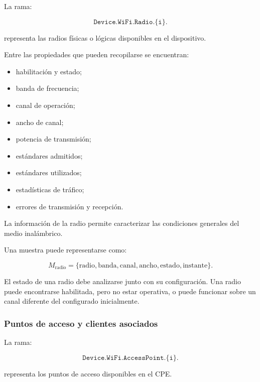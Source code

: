 La rama:

\[
    \texttt{Device.WiFi.Radio.\{i\}.}
\]

representa las radios físicas o lógicas disponibles en el dispositivo.

Entre las propiedades que pueden recopilarse se encuentran:

\begin{itemize}
    \item habilitación y estado;

    \item banda de frecuencia;

    \item canal de operación;

    \item ancho de canal;

    \item potencia de transmisión;

    \item estándares admitidos;

    \item estándares utilizados;

    \item estadísticas de tráfico;

    \item errores de transmisión y recepción.
\end{itemize}

La información de la radio permite caracterizar las condiciones generales
del medio inalámbrico.

Una muestra puede representarse como:

\[
    M_{\mathrm{radio}}
    =
    \{
        \text{radio},
        \text{banda},
        \text{canal},
        \text{ancho},
        \text{estado},
        \text{instante}
    \}.
\]

El estado de una radio debe analizarse junto con su configuración. Una
radio puede encontrarse habilitada, pero no estar operativa, o puede
funcionar sobre un canal diferente del configurado inicialmente.


\subsubsection*{Puntos de acceso y clientes asociados}

La rama:

\[
    \texttt{Device.WiFi.AccessPoint.\{i\}.}
\]

representa los puntos de acceso disponibles en el CPE.

